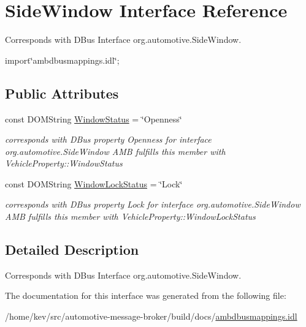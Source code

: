 \hypertarget{interfaceSideWindow}{\section{Side\+Window Interface Reference}
\label{interfaceSideWindow}
}


Corresponds with D\+Bus Interface org.\+automotive.\+Side\+Window.  




{\ttfamily import\char`\"{}ambdbusmappings.\+idl\char`\"{};}

\subsection*{Public Attributes}
\begin{DoxyCompactItemize}
\item 
\hypertarget{interfaceSideWindow_a8968254d124d26de8d55d58430fa3de7}{const D\+O\+M\+String \hyperlink{interfaceSideWindow_a8968254d124d26de8d55d58430fa3de7}{Window\+Status} = \char`\"{}Openness\char`\"{}}\label{interfaceSideWindow_a8968254d124d26de8d55d58430fa3de7}

\begin{DoxyCompactList}\small\item\em corresponds with D\+Bus property Openness for interface org.\+automotive.\+Side\+Window A\+M\+B fulfills this member with Vehicle\+Property\+::\+Window\+Status \end{DoxyCompactList}\item 
\hypertarget{interfaceSideWindow_a01854da7f347d50a309314a150a028fe}{const D\+O\+M\+String \hyperlink{interfaceSideWindow_a01854da7f347d50a309314a150a028fe}{Window\+Lock\+Status} = \char`\"{}Lock\char`\"{}}\label{interfaceSideWindow_a01854da7f347d50a309314a150a028fe}

\begin{DoxyCompactList}\small\item\em corresponds with D\+Bus property Lock for interface org.\+automotive.\+Side\+Window A\+M\+B fulfills this member with Vehicle\+Property\+::\+Window\+Lock\+Status \end{DoxyCompactList}\end{DoxyCompactItemize}


\subsection{Detailed Description}
Corresponds with D\+Bus Interface org.\+automotive.\+Side\+Window. 

The documentation for this interface was generated from the following file\+:\begin{DoxyCompactItemize}
\item 
/home/kev/src/automotive-\/message-\/broker/build/docs/\hyperlink{ambdbusmappings_8idl}{ambdbusmappings.\+idl}\end{DoxyCompactItemize}
